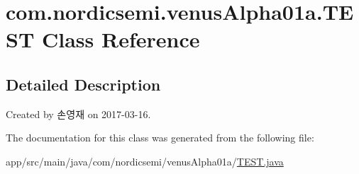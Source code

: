 \hypertarget{classcom_1_1nordicsemi_1_1venus_alpha01a_1_1_t_e_s_t}{}\section{com.\+nordicsemi.\+venus\+Alpha01a.\+T\+E\+ST Class Reference}
\label{classcom_1_1nordicsemi_1_1venus_alpha01a_1_1_t_e_s_t}


\subsection{Detailed Description}
Created by 손영재 on 2017-\/03-\/16. 

The documentation for this class was generated from the following file\+:\begin{DoxyCompactItemize}
\item 
app/src/main/java/com/nordicsemi/venus\+Alpha01a/\hyperlink{_t_e_s_t_8java}{T\+E\+S\+T.\+java}\end{DoxyCompactItemize}
